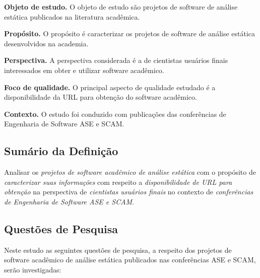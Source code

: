 \begin{description}
\item{\bf Objeto de estudo.} 
O objeto de estudo são projetos de software de análise estática publicados na literatura acadêmica.

\item{\bf Propósito.} 
O propósito é caracterizar os projetos de software de análise estática desenvolvidos na academia.

\item{\bf Perspectiva.} 
A perspectiva considerada é a de cientistas usuários finais interessados em obter e utilizar software acadêmico.

\item{\bf Foco de qualidade.} 
O principal aspecto de qualidade estudado é a disponibilidade da URL para obtenção do software acadêmico.

\item{\bf Contexto.} 
O estudo foi conduzido com publicações das conferências de Engenharia de Software ASE e SCAM.

\end{description}

\subsection{Sumário da Definição}


Analisar os \textit{projetos de software acadêmico de análise estática} %
com o propósito de \textit{caracterizar suas informações} %
com respeito a \textit{disponibilidade de URL para obtenção} %
na perspectiva de \textit{cientistas usuários finais} %
no contexto de \textit{conferências de Engenharia de Software ASE e SCAM}. %

\subsection{Questões de Pesquisa}

Neste estudo as seguintes questões de pesquisa, a respeito
dos projetos de software acadêmico de análise estática publicados nas conferências ASE e SCAM,
serão investigadas:

\newcommand{\EstudoUmQuestaoUm}{
  Quais são os projetos de software acadêmico de análise estática publicados
  com identificação de nome e URL?
}
\newcommand{\EstudoUmQuestaoDois}{
  Quantos projetos de software acadêmico de análise estática estão disponíveis
  para obtenção hoje?
}
\newcommand{\EstudoUmQuestaoTres}{
  Os projetos de software acadêmico de análise estática aceitam explicitamente
  contribuição via código fonte?
}

